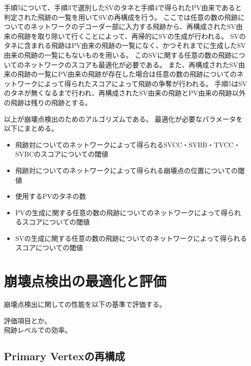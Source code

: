 手順5について、手順3で選別したSVのタネと手順4で得られたPV由来であると判定された飛跡の一覧を用いてSVの再構成を行う。
ここでは任意の数の飛跡についてのネットワークのデコーダー部に入力する飛跡から、再構成されたSV由来の飛跡を取り除いて行くことによって、再帰的にSVの生成が行われる。
SVのタネに含まれる飛跡はPV由来の飛跡の一覧になく、かつそれまでに生成したSV由来の飛跡の一覧にもないものを用いる。
このSVに関する任意の数の飛跡についてのネットワークのスコアも最適化が必要である。
また、再構成されたSV由来の飛跡の一覧にPV由来の飛跡が存在した場合は任意の数の飛跡についてのネットワークによって得られたスコアによって飛跡の争奪が行われる。
手順5はSVのタネが無くなるまで行われ、再構成されたSV由来の飛跡とPV由来の飛跡以外の飛跡は残りの飛跡とする。

以上が崩壊点検出のためのアルゴリズムである。
最適化が必要なパラメータを以下にまとめる。

\begin{itemize}
 \item 飛跡対についてのネットワークによって得られるSVCC・SVBB・TVCC・SVBCのスコアについての閾値
 \item 飛跡対についてのネットワークによって得られる崩壊点の位置についての閾値
 \item 使用するPVのタネの数
 \item PVの生成に関する任意の数の飛跡についてのネットワークによって得られるスコアについての閾値
 \item SVの生成に関する任意の数の飛跡についてのネットワークによって得られるスコアについての閾値
\end{itemize}

\section{崩壊点検出の最適化と評価} \label{VFDL:TuneandPerformanceofVFDL}

崩壊点検出に関しての性能を以下の基準で評価する。

評価項目とか。\\
飛跡レベルでの効率。\\

\subsection{Primary Vertexの再構成} \label{VFDL:AlgoVFDL:ReconstructionofPrimaryVertex}

